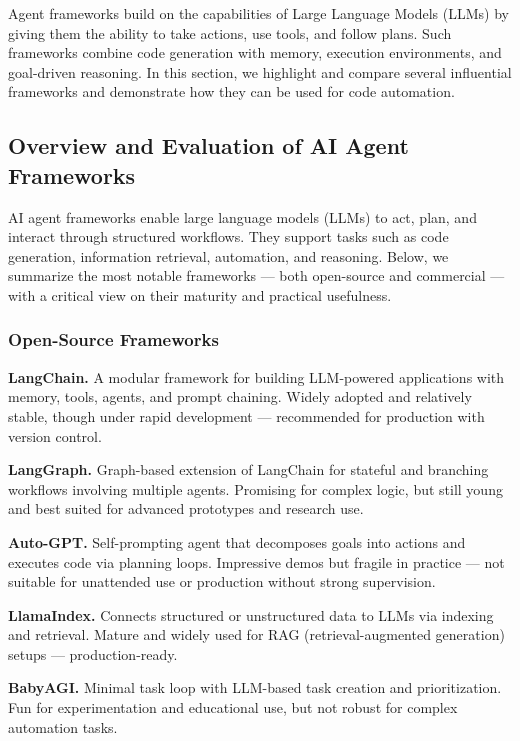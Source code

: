 Agent frameworks build on the capabilities of Large Language Models (LLMs) by giving them the ability to take actions, use tools, and follow plans. Such frameworks combine code generation with memory, execution environments, and goal-driven reasoning. In this section, we highlight and compare several influential frameworks and demonstrate how they can be used for code automation.

%
\subsection*{Overview and Evaluation of AI Agent Frameworks}

AI agent frameworks enable large language models (LLMs) to act, plan, and interact through structured workflows. They support tasks such as code generation, information retrieval, automation, and reasoning. Below, we summarize the most notable frameworks — both open-source and commercial — with a critical view on their maturity and practical usefulness.

\subsubsection*{Open-Source Frameworks}

\textbf{LangChain.} A modular framework for building LLM-powered applications with memory, tools, agents, and prompt chaining. Widely adopted and relatively stable, though under rapid development — recommended for production with version control.

\textbf{LangGraph.} Graph-based extension of LangChain for stateful and branching workflows involving multiple agents. Promising for complex logic, but still young and best suited for advanced prototypes and research use.

\textbf{Auto-GPT.} Self-prompting agent that decomposes goals into actions and executes code via planning loops. Impressive demos but fragile in practice — not suitable for unattended use or production without strong supervision.

\textbf{LlamaIndex.} Connects structured or unstructured data to LLMs via indexing and retrieval. Mature and widely used for RAG (retrieval-augmented generation) setups — production-ready.

\textbf{BabyAGI.} Minimal task loop with LLM-based task creation and prioritization. Fun for experimentation and educational use, but not robust for complex automation tasks.

